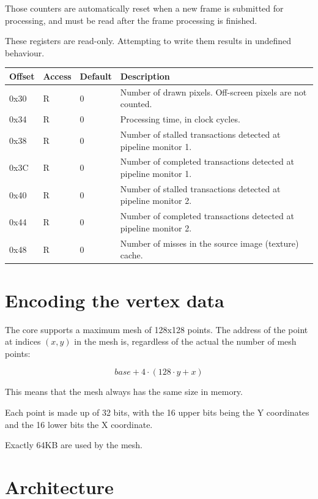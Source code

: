 \documentclass[a4paper,11pt]{article}
\begin{document}
Those counters are automatically reset when a new frame is submitted for processing, and must be read after the frame processing is finished.

These registers are read-only. Attempting to write them results in undefined behaviour.

\begin{tabularx}{\textwidth}{|l|l|l|X|}
\hline
\bf{Offset} & \bf{Access} & \bf{Default} & \bf{Description} \\
\hline
0x30 & R & 0 & Number of drawn pixels. Off-screen pixels are not counted. \\
\hline
0x34 & R & 0 & Processing time, in clock cycles. \\
\hline
0x38 & R & 0 & Number of stalled transactions detected at pipeline monitor 1. \\
\hline
0x3C & R & 0 & Number of completed transactions detected at pipeline monitor 1. \\
\hline
0x40 & R & 0 & Number of stalled transactions detected at pipeline monitor 2. \\
\hline
0x44 & R & 0 & Number of completed transactions detected at pipeline monitor 2. \\
\hline
0x48 & R & 0 & Number of misses in the source image (texture) cache. \\
\hline
\end{tabularx}

\section{Encoding the vertex data}
The core supports a maximum mesh of 128x128 points. The address of the point at indices $ (x, y) $ in the mesh is, regardless of the actual the number of mesh points:

\begin{equation*}
base + 4 \cdot (128 \cdot y + x)
\end{equation*}

This means that the mesh always has the same size in memory.

Each point is made up of 32 bits, with the 16 upper bits being the Y coordinates and the 16 lower bits the X coordinate.

Exactly 64KB are used by the mesh.

\section{Architecture}
\end{document}
